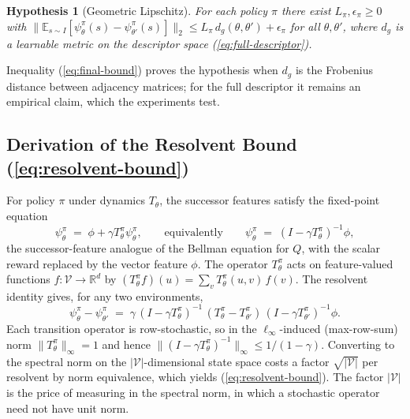 \documentclass[twoside]{article}
\newcommand{\R}{\mathbb{R}}
\newcommand{\E}{\mathbb{E}}
\newcommand{\Tdist}{T}
\newtheorem{hypothesis}[theorem]{Hypothesis}
\begin{document}
\begin{hypothesis}[Geometric Lipschitz]
\label{hyp:lipschitz}
For each policy $\pi$ there exist $L_\pi, \epsilon_\pi \geq 0$ with $\|\E_{s \sim I}[\psi^\pi_\theta(s) - \psi^\pi_{\theta'}(s)]\|_2 \leq L_\pi \, d_g(\theta, \theta') + \epsilon_\pi$ for all $\theta, \theta'$, where $d_g$ is a learnable metric on the descriptor space (\ref{eq:full-descriptor}).
\end{hypothesis}

\noindent Inequality (\ref{eq:final-bound}) proves the hypothesis when $d_g$ is the Frobenius distance between adjacency matrices; for the full descriptor it remains an empirical claim, which the experiments test.

\subsection{Derivation of the Resolvent Bound (\ref{eq:resolvent-bound})}

For policy $\pi$ under dynamics $\Tdist_\theta$, the successor features satisfy the fixed-point equation
\[
    \psi^\pi_\theta \;=\; \phi + \gamma T^\pi_\theta \psi^\pi_\theta,
    \qquad\text{equivalently}\qquad
    \psi^\pi_\theta \;=\; (I - \gamma T^\pi_\theta)^{-1} \phi ,
\]
the successor-feature analogue of the Bellman equation for $Q$, with the scalar reward replaced by the vector feature $\phi$. The operator $T^\pi_\theta$ acts on feature-valued functions $f : \mathcal V \to \R^d$ by $(T^\pi_\theta f)(u) = \sum_{v} T^\pi_\theta(u,v)\, f(v)$. The resolvent identity gives, for any two environments,
\[
    \psi^\pi_\theta - \psi^\pi_{\theta'}
    \;=\;
    \gamma \, (I - \gamma T^\pi_\theta)^{-1} \, (T^\pi_\theta - T^\pi_{\theta'}) \, (I - \gamma T^\pi_{\theta'})^{-1} \phi.
\]
Each transition operator is row-stochastic, so in the $\ell_\infty$-induced (max-row-sum) norm $\|T^\pi_\theta\|_\infty = 1$ and hence $\|(I - \gamma T^\pi_\theta)^{-1}\|_\infty \le 1/(1-\gamma)$. Converting to the spectral norm on the $|\mathcal V|$-dimensional state space costs a factor $\sqrt{|\mathcal V|}$ per resolvent by norm equivalence, which yields (\ref{eq:resolvent-bound}). The factor $|\mathcal V|$ is the price of measuring in the spectral norm, in which a stochastic operator need not have unit norm.
\end{document}
